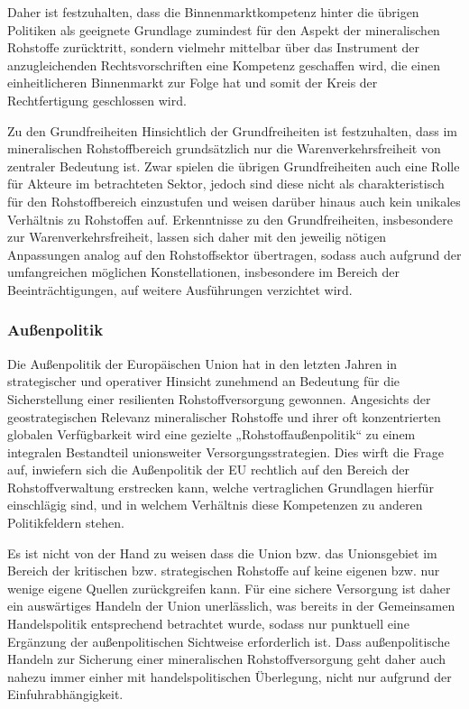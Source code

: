 \documentclass[12pt,a4paper,oneside]{book} %
\begin{document}
Daher ist festzuhalten, dass die Binnenmarktkompetenz hinter die übrigen Politiken als geeignete Grundlage zumindest für den Aspekt der mineralischen Rohstoffe zurücktritt, sondern vielmehr mittelbar über das Instrument der anzugleichenden Rechtsvorschriften eine Kompetenz geschaffen wird, die einen einheitlicheren Binnenmarkt zur Folge hat und somit der Kreis der Rechtfertigung geschlossen wird.


Zu den Grundfreiheiten
Hinsichtlich der Grundfreiheiten ist festzuhalten, dass im mineralischen Rohstoffbereich grundsätzlich nur die Warenverkehrsfreiheit von zentraler Bedeutung ist. Zwar spielen die übrigen Grundfreiheiten auch eine Rolle für Akteure im betrachteten Sektor, jedoch sind diese nicht als charakteristisch für den Rohstoffbereich einzustufen und weisen darüber hinaus auch kein unikales Verhältnis zu Rohstoffen auf.\autocite[So auch]{Frau 2025, S. 395} Erkenntnisse zu den Grundfreiheiten, insbesondere zur Warenverkehrsfreiheit, lassen sich daher mit den jeweilig nötigen Anpassungen analog auf den Rohstoffsektor übertragen, sodass auch aufgrund der umfangreichen möglichen Konstellationen, insbesondere im Bereich der Beeinträchtigungen, auf weitere Ausführungen verzichtet wird.
	

	
\subsubsection{Außenpolitik}
Die Außenpolitik der Europäischen Union hat in den letzten Jahren in strategischer und operativer Hinsicht zunehmend an Bedeutung für die Sicherstellung einer resilienten Rohstoffversorgung gewonnen. Angesichts der geostrategischen Relevanz mineralischer Rohstoffe und ihrer oft konzentrierten globalen Verfügbarkeit wird eine gezielte „Rohstoffaußenpolitik“ zu einem integralen Bestandteil unionsweiter Versorgungsstrategien. Dies wirft die Frage auf, inwiefern sich die Außenpolitik der EU rechtlich auf den Bereich der Rohstoffverwaltung erstrecken kann, welche vertraglichen Grundlagen hierfür einschlägig sind, und in welchem Verhältnis diese Kompetenzen zu anderen Politikfeldern stehen.

Es ist nicht von der Hand zu weisen dass die Union bzw. das Unionsgebiet im Bereich der kritischen bzw. strategischen Rohstoffe auf keine eigenen bzw. nur wenige eigene Quellen zurückgreifen kann. Für eine sichere Versorgung ist daher ein auswärtiges Handeln der Union unerlässlich, was bereits in der Gemeinsamen Handelspolitik entsprechend betrachtet wurde, sodass nur punktuell eine Ergänzung der außenpolitischen Sichtweise erforderlich ist. Dass außenpolitische Handeln zur Sicherung einer mineralischen Rohstoffversorgung geht daher auch nahezu immer einher mit handelspolitischen Überlegung, nicht nur aufgrund der Einfuhrabhängigkeit.
\end{document}
